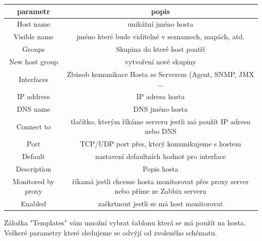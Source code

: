 \documentclass{article}
\begin{document}
\begin{center}
  \begin{tabular}{ | c | c | }
    \hline
    parametr & popis  \\ \hline
    Host name & unikátní jméno hosta \\ \hline
    Visible name & jméno které bude viditelné v seznamech, mapách, atd.\\  \hline
    Groups & Skupina do které host poatří \\ \hline
    New host group & vytvoření nové skupiny\\  \hline
    Interfaces & Zbůsob komunikace Hosta se Serverem (Agent, SNMP, JMX ... \\ \hline
    IP address & IP adresa hosta \\ \hline
    DNS name & DNS jméno hosta \\ \hline
    Connect to & tlačítko, kterým říkáme serveru jestli má použít IP adresu nebo DNS \\ \hline
    Port & TCP/UDP port přes, který komunikujeme s hostem \\ \hline
    Default & nastavení defaultních hodnot pro interface \\ \hline
    Description & Popis hosta\\ \hline
    Monitored by proxy & říkamá jestli chceme hosta monitorovat přes proxy server nebo příme ze Zabbix serveru \\ \hline
    Enabled & zaškrtnout jestli se má host monitorovat \\ \hline
  \end{tabular}
  \end{center}
  Záložka "Templates" vám umožní vybrat šablonu která se má použít na hosta. Veškeré parametry které sledujeme se odvýjí od zvoleného schématu.
\end{document}
